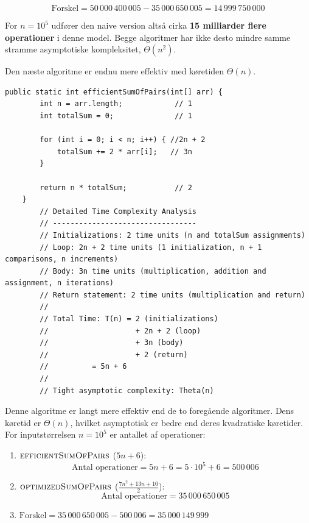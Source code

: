 \[
\text{Forskel} = 50\,000\,400\,005-35\,000\,650\,005=14\,999\,750\,000
\]

For \(n=10^5\) udfører den naive version altså cirka \textbf{15 milliarder flere operationer} i denne model. Begge algoritmer har ikke desto mindre samme stramme asymptotiske kompleksitet, $\Theta(n^2)$.

Den næste algoritme er endnu mere effektiv med køretiden $\Theta(n)$.
\begin{lstlisting}[style = javaStyle, caption={Effektiv sum af par med analyse}, label={lst:java_efficient_sum_pairs_analysis}]
    public static int efficientSumOfPairs(int[] arr) {
        int n = arr.length;            // 1
        int totalSum = 0;              // 1
    
        for (int i = 0; i < n; i++) { //2n + 2
            totalSum += 2 * arr[i];   // 3n
        }
    
        return n * totalSum;           // 2
    }
        // Detailed Time Complexity Analysis
        // ---------------------------------
        // Initializations: 2 time units (n and totalSum assignments)
        // Loop: 2n + 2 time units (1 initialization, n + 1 comparisons, n increments)
        // Body: 3n time units (multiplication, addition and assignment, n iterations)
        // Return statement: 2 time units (multiplication and return)
        //
        // Total Time: T(n) = 2 (initializations)
        //                    + 2n + 2 (loop)
        //                    + 3n (body)
        //                    + 2 (return)
        //          = 5n + 6
        //
        // Tight asymptotic complexity: Theta(n)
\end{lstlisting}    

Denne algoritme er langt mere effektiv end de to foregående algoritmer. Dens køretid er $\Theta(n)$, hvilket asymptotisk er bedre end deres kvadratiske køretider. For inputstørrelsen \(n = 10^5\) er antallet af operationer:

\begin{enumerate}
    \item $\proc{efficientSumOfPairs}$ (\(5n+6\)):
    \[
    \text{Antal operationer} = 5n+6 = 5\cdot 10^5+6 = 500\,006
    \]
    \item $\proc{optimizedSumOfPairs}$ (\(\tfrac{7n^2+13n+10}{2}\)):
    \[
    \text{Antal operationer} = 35\,000\,650\,005
    \]
    \item $\text{Forskel} = 35\,000\,650\,005-500\,006=35\,000\,149\,999$
\end{enumerate}

